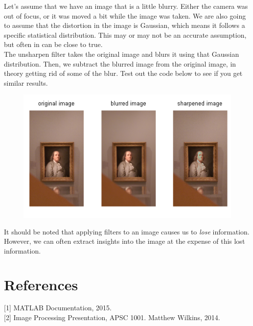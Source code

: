 \documentclass[paper=a4, fontsize=11pt]{scrartcl} %
\numberwithin{equation}{section} %
\numberwithin{figure}{section} %
\numberwithin{table}{section} %
\begin{document}
Let's assume that we have an image that is a little blurry. Either the camera was out of focus, or it was moved a bit while the image was taken. We are also going to assume that the distortion in the image is Gaussian, which means it follows a specific statistical distribution. This may or may not be an accurate assumption, but often in can be close to true.\\

The unsharpen filter takes the original image and blurs it using that Gaussian distribution. Then, we subtract the blurred image from the original image, in theory getting rid of some of the blur. Test out the code below to see if you get similar results.


\begin{figure}[h]
\centering
\includegraphics[scale=.95]{sharpened}
\end{figure}

It should be noted that applying filters to an image causes us to \textit{lose} information. However, we can often extract insights into the image at the expense of this lost information.

\section*{References}
[1] MATLAB Documentation, 2015.\\

[2] Image Processing Presentation, APSC 1001. Matthew Wilkins, 2014.
\end{document}
